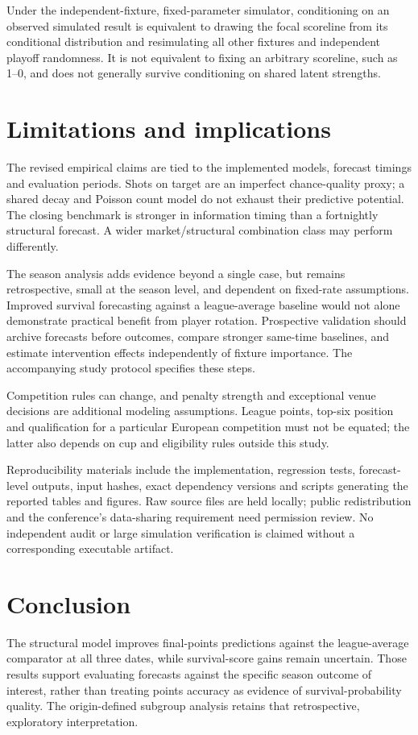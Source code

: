 \documentclass[11pt]{article}
\begin{document}
Under the independent-fixture, fixed-parameter simulator, conditioning on an
observed simulated result is equivalent to drawing the focal scoreline from
its conditional distribution and resimulating all other fixtures and
independent playoff randomness. It is not equivalent to fixing an arbitrary
scoreline, such as 1--0, and does not generally survive conditioning on shared
latent strengths.

\section{Limitations and implications}
The revised empirical claims are tied to the implemented models,
forecast timings and evaluation periods. Shots on target are an imperfect
chance-quality proxy; a shared decay and Poisson count model do not exhaust
their predictive potential. The closing benchmark is stronger in information
timing than a fortnightly structural forecast. A wider market/structural
combination class may perform differently.

The season analysis adds evidence beyond a single case, but remains
retrospective, small at the season level, and dependent on fixed-rate
assumptions. Improved survival forecasting against a league-average baseline
would not alone demonstrate practical benefit from player rotation.
Prospective validation should archive forecasts before outcomes, compare
stronger same-time baselines, and estimate intervention effects independently
of fixture importance. The accompanying study protocol specifies these steps.

Competition rules can change, and penalty strength and exceptional venue
decisions are additional modeling assumptions. League points, top-six position
and qualification for a particular European competition must not be equated;
the latter also depends on cup and eligibility rules outside this study.

Reproducibility materials include the implementation, regression tests,
forecast-level outputs, input hashes, exact dependency versions and scripts
generating the reported tables and figures. Raw source files are held locally;
public redistribution and the conference's data-sharing requirement need
permission review. No independent audit or large simulation verification is
claimed without a corresponding executable artifact.

\section{Conclusion}
The structural model improves final-points predictions against the
league-average comparator at all three dates, while survival-score gains
remain uncertain. Those results support evaluating forecasts against the
specific season outcome of interest, rather than treating points accuracy as
evidence of survival-probability quality. The origin-defined subgroup analysis
retains that retrospective, exploratory interpretation.
\end{document}
